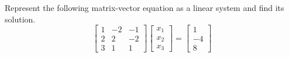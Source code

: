 \item Represent the following matrix-vector equation as a linear system and find its solution.
\[ \left[ \begin{array}{crr} 1 & -2 & -1 \\ 2 & 2 & -2 \\ 3 & 1 & 1  \end{array} \right] \left[ \begin{array}{c} x_1 \\ x_2 \\ x_3 \end{array} \right] = \left[ \begin{array}{r} 1\\ -4\\8 \end{array} \right] \]


